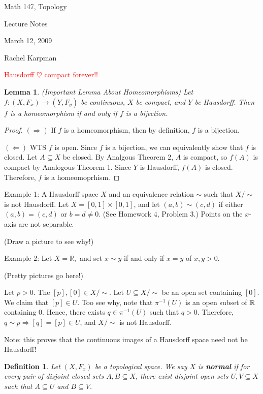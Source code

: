\documentclass{amsart}
\newtheorem{lem}{Lemma}
\newtheorem{defn}{Definition}
\begin{document}
Math 147, Topology

Lecture Notes

March 12, 2009

Rachel Karpman

\setlength{\parskip}{0.1 in}
\textcolor{red}{Hausdorff $\heartsuit$ compact forever!!}

\begin{lem}(Important Lemma About Homeomorphisms)  Let $f:(X,F_x)\rightarrow(Y,F_y)$ be continuous, $X$ be compact, and $Y$ be Hausdorff.  Then $f$ is a homeomorphism if and only if $f$ is a bijection.
\end{lem}
\begin{proof}
$(\Rightarrow)$  If $f$ is a homeomorphism, then by definition, $f$ is a bijection.

$(\Leftarrow)$  WTS $f$ is open.  Since $f$ is a bijection, we can equivalently show that $f$ is closed.  Let $A \subseteq X$ be closed.  By Analgous Theorem 2, $A$ is compact, so $f(A)$ is compact by Analogous Theorem 1.  Since $Y$ is Hausdorff, $f(A)$ is closed.  Therefore, $f$ is a homeomoprhism.
\end{proof}

Example 1: A Hausdorff space $X$ and an equivalence relation $\sim$ such that $X/\sim$ is not Hausdorff.  Let $X=[0,1]\times[0,1]$, and let $(a,b)\sim(c,d)$ if either $(a,b)=(c,d)$ or $b=d\neq 0.$  (See Homework $4$, Problem $3$.)  Points on the $x$-axis are not separable. 
 
(Draw a picture to see why!)

\vspace{1.5 in}

Example 2: Let $X=\mathbb{R},$ and set $x \sim y$ if and only if $x=y$ of $x,y>0.$  

(Pretty pictures go here!)

\vspace{1.5 in}

Let $p>0.$  The $[p],[0]\in X/\sim$.  Let $U \subseteq X/\sim$ be an open set containing $[0].$  We claim that $[p]\in U$.  Too see why, note that $\pi^{-1}(U)$ is an open subset of $\mathbb R$ containing $0$.  Hence, there exists $q \in \pi^{-1}(U)$ such that $q>0.$  Therefore, $q \sim p \Rightarrow [q]=[p]\in U$, and $X/\sim$ is not Hausdorff.

Note: this proves that the continuous images of a Hausdorff space need not be Hausdorff!

\begin{defn}  Let $(X,F_x)$ be a topological space.  We say $X$ is \textbf{normal} if for every pair of disjoint closed sets $A,B \subseteq X$, there exist disjoint open sets $U,V\subseteq X$ such that $A \subseteq U$ and $B \subseteq V$.
\end{defn}
\end{document}
